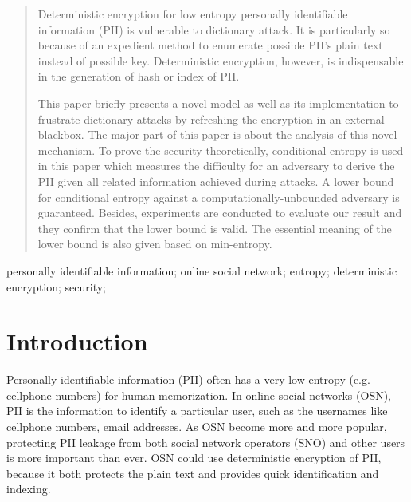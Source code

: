 \documentclass[10pt, conference, compsocconf]{IEEEtran}
\begin{document}




\maketitle


\begin{abstract}
	Deterministic encryption for low entropy personally identifiable information
	(PII) is vulnerable 
	to dictionary attack. It is particularly so because 
	of an expedient method to enumerate possible PII's 
	plain text instead of possible key.
	Deterministic encryption, however, 
	is indispensable in the generation of hash or index of PII.
	
	This paper briefly presents a novel model as well as
	its implementation to frustrate dictionary attacks
	by refreshing the encryption in an external blackbox.	
	The major part of this paper is about the analysis
	of this novel mechanism.
	To prove the security  theoretically,
	conditional entropy is used in this paper which
	measures the difficulty for an adversary to
	derive the PII given all related information achieved during attacks.
	A lower bound for conditional entropy
	against a computationally-unbounded adversary is guaranteed.
	Besides, experiments are conducted to evaluate our result and
	they confirm that the lower bound is valid.
	The essential meaning of the lower bound is also
	given based on min-entropy.
	
\end{abstract}

\begin{IEEEkeywords}
personally identifiable information; online social network; entropy; deterministic encryption;
security;

\end{IEEEkeywords}


%
\IEEEpeerreviewmaketitle



\section{Introduction}
	Personally identifiable information (PII) often has
	a very low entropy (e.g. cellphone numbers) for human memorization.
	In online social networks (OSN), PII is the information
	to identify a particular user, such as the usernames like cellphone numbers,
	email addresses.	
	As OSN become more and more popular,
	protecting PII leakage from both social network operators (SNO)
	and other users is more important than ever.
	OSN could use deterministic encryption of PII,
	because it both protects the plain text and provides quick identification
	and indexing.
\end{document}
